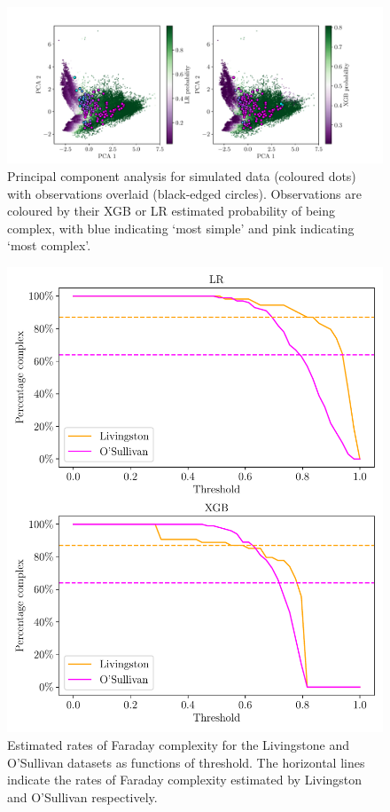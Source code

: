     \begin{figure}
      \centering
      \includegraphics[width=\linewidth]{faraday-images/pca_with_overlay.pdf}
      \caption{Principal component analysis for simulated data (coloured dots) with observations overlaid (black-edged circles). Observations are coloured by their XGB or LR estimated probability of being complex, with blue indicating `most simple' and pink indicating `most complex'.}
      \label{fig:pca}
    \end{figure}
    \begin{figure}
      \centering
      \includegraphics[width=\linewidth]{faraday-images/pc_complex_curves.pdf}
      \caption{Estimated rates of Faraday complexity for the Livingstone and O'Sullivan datasets as functions of threshold. The horizontal lines indicate the rates of Faraday complexity estimated by Livingston and O'Sullivan respectively.}
      \label{fig:complexity-rates}
    \end{figure}

